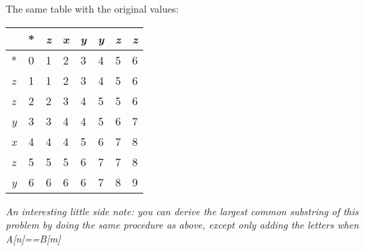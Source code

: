 \documentclass{article}
\begin{document}
\begin{enumerate}
\begin{enumerate}
The same table with the original values:

\begin{tabular}{| l | c | c | c | c | c | c | r | }
\hline
   	& * & \textit{z} & \textit{x} & \textit{y} & \textit{y} & \textit{z} & \textit{z} \\ \hline
  * 	   & \cellcolor[gray]{0.8} 0 & 1 & 2 & 3 & 4 & 5 & 6 \\ \hline
\textit{z} & \cellcolor[gray]{0.8} 1 & 1 & 2 & 3 & 4 & 5 & 6 \\ \hline
\textit{z} & 2 & \cellcolor[gray]{0.8} 2 & 3 & 4 & 5 & 5 & 6 \\ \hline
\textit{y} & 3 & \cellcolor[gray]{0.8} 3 & 4 & 4 & 5 & 6 & 7 \\ \hline
\textit{x} & 4 & 4 & \cellcolor[gray]{0.8} 4 & 5 & 6 & 7 & 8 \\ \hline
\textit{z} & 5 & 5 & \cellcolor[gray]{0.8} 5 & \cellcolor[gray]{0.8} 6 & 7 & 7 & 8 \\ \hline
\textit{y} & 6 & 6 & 6 & 6 & \cellcolor[gray]{0.8} 7 & \cellcolor[gray]{0.8} 8 & \cellcolor[gray]{0.8} 9 \\ \hline
\end{tabular}


\textit{An interesting little side note: you can derive the largest common substring of this problem by doing the same procedure as above, except only adding the letters when A[n]==B[m]}
\end{enumerate}
\end{enumerate}
\end{document}
